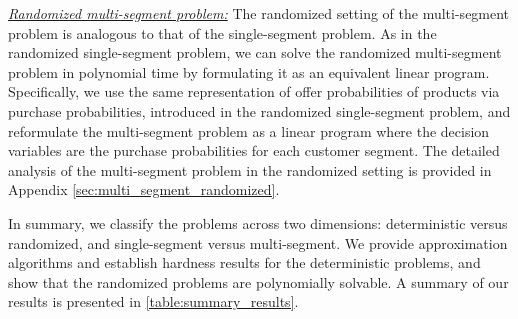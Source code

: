 \documentclass[msom,non-blindrev]{informs3} %
\theoremstyle{definition}
\begin{document}
\noindent\underline{\textit{Randomized multi-segment problem:}} 
The randomized setting of the multi-segment problem is analogous to that of the single-segment problem. As in the randomized single-segment problem, we can solve the randomized multi-segment problem in polynomial time by formulating it as an equivalent linear program. Specifically, we use the same representation of {  offer probabilities of products} via purchase probabilities, introduced in the randomized single-segment problem, and reformulate the multi-segment problem as a linear program where the decision variables are the purchase probabilities for each customer segment. The detailed analysis of the multi-segment problem in the randomized setting is provided in Appendix \ref{sec:multi_segment_randomized}.




In summary, we classify the problems across two dimensions: deterministic versus randomized, and single-segment versus multi-segment. We provide approximation algorithms and establish hardness results for the deterministic problems, and show that the randomized problems are polynomially solvable. A summary of our results is presented in \cref{table:summary_results}.


\end{document}

